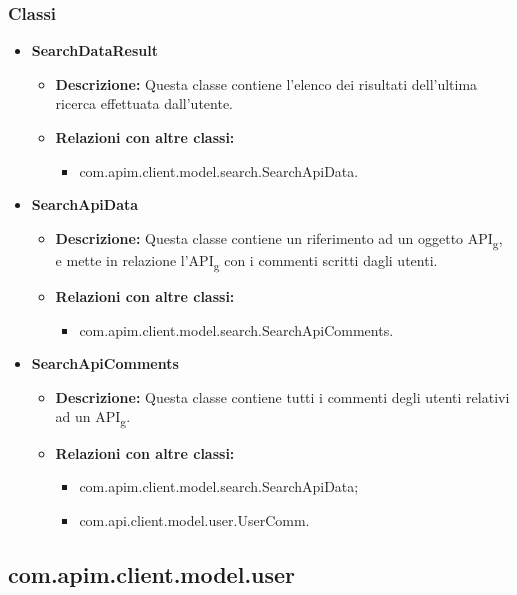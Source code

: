 {{{			\subsubsection{Classi}{
				\begin{itemize}
					\item \textbf{SearchDataResult}
						\begin{itemize}
							\item \textbf{Descrizione:} Questa classe contiene l'elenco dei risultati dell'ultima ricerca effettuata dall'utente.
							\item \textbf{Relazioni con altre classi:}
							\begin{itemize}
								\item com.apim.client.model.search.SearchApiData.
							\end{itemize}
						\end{itemize}
					\item \textbf{SearchApiData}
						\begin{itemize}
							\item \textbf{Descrizione:} Questa classe contiene un riferimento ad un oggetto API\textsubscript{g}, e mette in relazione l'API\textsubscript{g} con i commenti scritti dagli utenti.
							\item \textbf{Relazioni con altre classi:}
							\begin{itemize}
								\item com.apim.client.model.search.SearchApiComments.
							\end{itemize}
						\end{itemize}
					\item \textbf{SearchApiComments}
						\begin{itemize}
							\item \textbf{Descrizione:} Questa classe contiene tutti i commenti degli utenti relativi ad un API\textsubscript{g}.
							\item \textbf{Relazioni con altre classi:}
							\begin{itemize}
								\item com.apim.client.model.search.SearchApiData;
								\item com.api.client.model.user.UserComm.
							\end{itemize}
						\end{itemize}
				\end{itemize}
			}
		}
	}
	\subsection{com.apim.client.model.user}{
}}
